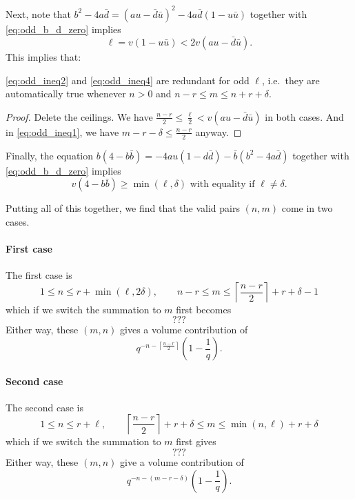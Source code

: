 Next, note that
$b^2-4a\bar d = (au - \bar d \bar u)^2 - 4a \bar d (1-u \bar u)$
together with \eqref{eq:odd_b_d_zero} implies
\begin{equation}
  \ell = v(1-u \bar u) < 2v(au - \bar d \bar u).
  \label{eq:odd_center_distance}
\end{equation}
This implies that:
\begin{fact}
  \eqref{eq:odd_ineq2} and \eqref{eq:odd_ineq4} are redundant for odd $\ell$,
  i.e.\ they are automatically true whenever $n > 0$ and $n-r \le m \le n+r+\delta$.
\end{fact}
\begin{proof}
  Delete the ceilings.
  We have $\frac{n-r}{2} \le \frac{\ell}{2} < v(au - \bar d \bar u)$ in both cases.
  And in \eqref{eq:odd_ineq1}, we have $m-r-\delta \le \frac{n-r}{2}$ anyway.
\end{proof}

Finally, the equation $b(4-b \bar b) = -4au(1-d\bar d) - \bar b(b^2-4a\bar d)$
together with \eqref{eq:odd_b_d_zero} implies
\begin{equation}
  v(4-b\bar b) \ge \min(\ell,\delta) \text{ with equality if } \ell \neq \delta.
  \label{eq:odd_bb}
\end{equation}

Putting all of this together,
we find that the valid pairs $(n,m)$ come in two cases.

\paragraph{First case}
The first case is
\[
  1 \leq n \leq r + \min(\ell, 2\delta),
  \qquad n-r \leq m \leq \left\lceil \frac{n-r}{2} \right\rceil+r+\delta - 1
\]
which if we switch the summation to $m$ first becomes
\begin{equation}
  ???
  \label{eq:odd_range1}
\end{equation}
Either way, these $(m,n)$ gives a volume contribution of
\[ q^{-n - \left\lceil \frac{n-r}{2} \right\rceil} \left( 1 - \frac 1q \right). \]

\paragraph{Second case}
The second case is
\[
  1 \leq n \leq r + \ell,
  \qquad \left\lceil \frac{n-r}{2} \right\rceil+r+\delta
  \leq m \leq \min(n,\ell)+r+\delta
\]
which if we switch the summation to $m$ first gives
\begin{equation}
  ???
  \label{eq:odd_range2}
\end{equation}
Either way, these $(m,n)$ give a volume contribution of
\[ q^{-n - (m-r-\delta)} \left( 1 - \frac 1q \right). \]

